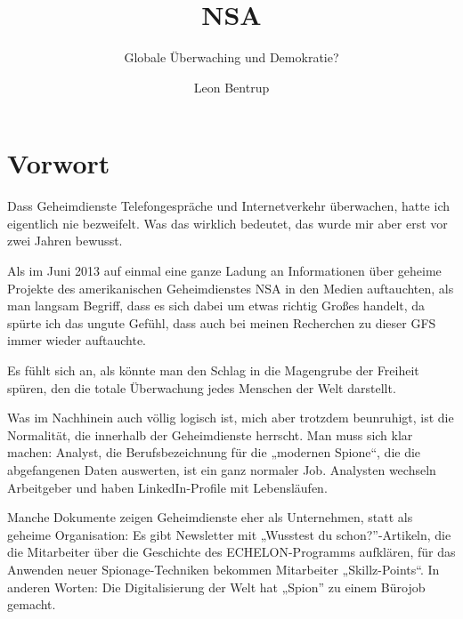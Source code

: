 \documentclass[12pt,a4paper]{scrartcl}
\author{Leon Bentrup}
\title{NSA}
\subtitle{Globale Überwaching und Demokratie?}
\begin{document}
\maketitle
\tableofcontents
\newpage
{}

\section{Vorwort}
Dass Geheimdienste Telefongespräche und Internetverkehr überwachen, hatte ich eigentlich nie bezweifelt. Was das wirklich bedeutet, das wurde mir aber erst vor zwei Jahren bewusst.

Als im Juni 2013 auf einmal eine ganze Ladung an Informationen über geheime Projekte des amerikanischen Geheimdienstes NSA in den Medien auftauchten, als man langsam Begriff, dass es sich dabei um etwas richtig Großes handelt, da spürte ich das ungute Gefühl, dass auch bei meinen Recherchen zu dieser GFS immer wieder auftauchte.

Es fühlt sich an, als könnte man den Schlag in die Magengrube der Freiheit spüren, den die totale Überwachung jedes Menschen der Welt darstellt.

Was im Nachhinein auch völlig logisch ist, mich aber trotzdem beunruhigt, ist die Normalität, die innerhalb der Geheimdienste herrscht. Man muss sich klar machen: Analyst, die Berufsbezeichnung für die „modernen Spione“, die die abgefangenen Daten auswerten, ist ein ganz normaler Job. Analysten wechseln Arbeitgeber und haben LinkedIn-Profile mit Lebensläufen.

Manche Dokumente zeigen Geheimdienste eher als Unternehmen, statt als geheime Organisation: Es gibt Newsletter mit „Wusstest du schon?”-Artikeln, die die Mitarbeiter über die Geschichte des ECHELON-Programms aufklären, für das Anwenden neuer Spionage-Techniken bekommen Mitarbeiter „Skillz-Points“. In anderen Worten: Die Digitalisierung der Welt hat „Spion” zu einem Bürojob gemacht.
\end{document}
